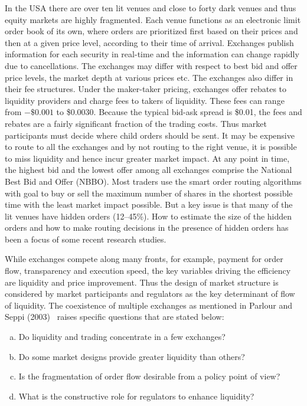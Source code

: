 In the USA there are over ten lit venues and close to forty dark venues and thus equity markets are highly fragmented. Each venue functions as an electronic limit order book of its own, where orders are prioritized first based on their prices and then at a given price level, according to their time of arrival. Exchanges publish information for each security in real-time and the information can change rapidly due to cancellations. The exchanges may differ with respect to best bid and offer price levels, the market depth at various prices etc. The exchanges also differ in their fee structures. Under the maker-taker pricing, exchanges offer rebates to liquidity providers and charge fees to takers of liquidity. These fees can range from $-\$0.001$ to \$0.0030. Because the typical bid-ask spread is \$0.01, the fees and rebates are a fairly significant fraction of the trading costs. Thus market participants must decide where child orders should be sent. It may be expensive to route to all the exchanges and by not routing to the right venue, it is possible to miss liquidity and hence incur greater market impact. At any point in time, the highest bid and the lowest offer among all exchanges comprise the National Best Bid and Offer (NBBO). Most traders use the smart order routing algorithms with goal to buy or sell the maximum number of shares in the shortest possible time with the least market impact possible. But a key issue is that many of the lit venues have hidden orders (12--45\%). How to estimate the size of the hidden orders and how to make routing decisions in the presence of hidden orders has been a focus of some recent research studies.


While exchanges compete along many fronts, for example, payment for order flow, transparency and execution speed, the key variables driving the efficiency are liquidity and price improvement. Thus the design of market structure is considered by market participants and regulators as the key determinant of flow of liquidity. The coexistence of multiple exchanges as mentioned in Parlour and Seppi (2003)~\cite{parlour2003} raises specific questions that are stated below:
        \begin{enumerate}[a)]
        \item Do liquidity and trading concentrate in a few exchanges?
        \item Do some market designs provide greater liquidity than others?
        \item Is the fragmentation of order flow desirable from a policy point of view?
        \item What is the constructive role for regulators to enhance liquidity?
        \end{enumerate}


